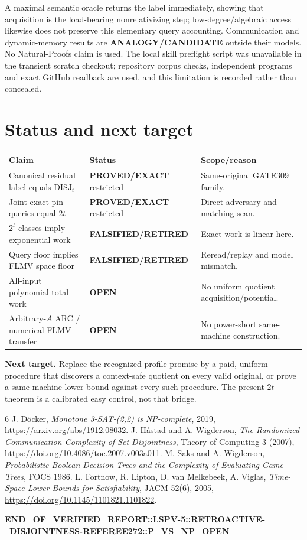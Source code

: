 \documentclass[11pt]{article}
\begin{document}
A maximal semantic oracle returns the label immediately, showing that acquisition
is the load-bearing nonrelativizing step; low-degree/algebraic access likewise does
not preserve this elementary query accounting.  Communication and dynamic-memory
results are \textbf{ANALOGY/CANDIDATE} outside their models.  No Natural-Proofs
claim is used.  The local skill preflight script was unavailable in the transient
scratch checkout; repository corpus checks, independent programs and exact GitHub
readback are used, and this limitation is recorded rather than concealed.

\section{Status and next target}
\begin{center}\scriptsize\begin{tabular}{p{.36\linewidth}p{.19\linewidth}p{.29\linewidth}}\toprule
Claim&Status&Scope/reason\\\midrule
Canonical residual label equals $\mathrm{DISJ}_t$&\textbf{PROVED/EXACT} restricted&Same-original GATE309 family.\\
Joint exact pin queries equal $2t$&\textbf{PROVED/EXACT} restricted&Direct adversary and matching scan.\\
$2^t$ classes imply exponential work&\textbf{FALSIFIED/RETIRED}&Exact work is linear here.\\
Query floor implies FLMV space floor&\textbf{FALSIFIED/RETIRED}&Reread/replay and model mismatch.\\
All-input polynomial total work&\textbf{OPEN}&No uniform quotient acquisition/potential.\\
Arbitrary-$A$ ARC / numerical FLMV transfer&\textbf{OPEN}&No power-short same-machine construction.\\\bottomrule
\end{tabular}\end{center}

\noindent\textbf{Next target.} Replace the recognized-profile promise by a paid,
uniform procedure that discovers a context-safe quotient on every valid original,
or prove a same-machine lower bound against every such procedure.  The present
$2t$ theorem is a calibrated easy control, not that bridge.

\begin{thebibliography}{6}
 J. D\"ocker, \emph{Monotone 3-SAT-(2,2) is NP-complete}, 2019, \url{https://arxiv.org/abs/1912.08032}.
 J. H\r{a}stad and A. Wigderson, \emph{The Randomized Communication Complexity of Set Disjointness}, Theory of Computing 3 (2007), \url{https://doi.org/10.4086/toc.2007.v003a011}.
 M. Saks and A. Wigderson, \emph{Probabilistic Boolean Decision Trees and the Complexity of Evaluating Game Trees}, FOCS 1986.
 L. Fortnow, R. Lipton, D. van Melkebeek, A. Viglas, \emph{Time-Space Lower Bounds for Satisfiability}, JACM 52(6), 2005, \url{https://doi.org/10.1145/1101821.1101822}.
\end{thebibliography}

\noindent\small\textbf{END\_OF\_VERIFIED\_REPORT::LSPV-5::RETROACTIVE-\
DISJOINTNESS-REFEREE272::P\_VS\_NP\_OPEN}
\end{document}
